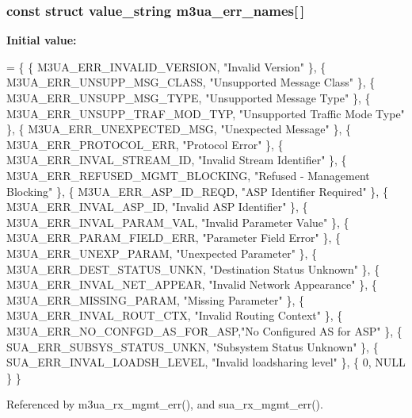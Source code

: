 \subsubsection[{m3ua\+\_\+err\+\_\+names}]{\setlength{\rightskip}{0pt plus 5cm}const struct value\+\_\+string m3ua\+\_\+err\+\_\+names[$\,$]}\label{m3ua_8c_a11c55fb5f6f56682c1754819b5a80eba}
{\bfseries Initial value\+:}
\begin{DoxyCode}
= \{
        \{ M3UA_ERR_INVALID_VERSION,     \textcolor{stringliteral}{"Invalid Version"} \},
        \{ M3UA_ERR_UNSUPP_MSG_CLASS,    \textcolor{stringliteral}{"Unsupported Message Class"} \},
        \{ M3UA_ERR_UNSUPP_MSG_TYPE,     \textcolor{stringliteral}{"Unsupported Message Type"} \},
        \{ M3UA_ERR_UNSUPP_TRAF_MOD_TYP, \textcolor{stringliteral}{"Unsupported Traffic Mode Type"} \},
        \{ M3UA_ERR_UNEXPECTED_MSG,      \textcolor{stringliteral}{"Unexpected Message"} \},
        \{ M3UA_ERR_PROTOCOL_ERR,        \textcolor{stringliteral}{"Protocol Error"} \},
        \{ M3UA_ERR_INVAL_STREAM_ID,     \textcolor{stringliteral}{"Invalid Stream Identifier"} \},
        \{ M3UA_ERR_REFUSED_MGMT_BLOCKING, \textcolor{stringliteral}{"Refused - Management Blocking"} \},
        \{ M3UA_ERR_ASP_ID_REQD,         \textcolor{stringliteral}{"ASP Identifier Required"} \},
        \{ M3UA_ERR_INVAL_ASP_ID,        \textcolor{stringliteral}{"Invalid ASP Identifier"} \},
        \{ M3UA_ERR_INVAL_PARAM_VAL,     \textcolor{stringliteral}{"Invalid Parameter Value"} \},
        \{ M3UA_ERR_PARAM_FIELD_ERR,     \textcolor{stringliteral}{"Parameter Field Error"} \},
        \{ M3UA_ERR_UNEXP_PARAM,         \textcolor{stringliteral}{"Unexpected Parameter"} \},
        \{ M3UA_ERR_DEST_STATUS_UNKN,    \textcolor{stringliteral}{"Destination Status Unknown"} \},
        \{ M3UA_ERR_INVAL_NET_APPEAR,    \textcolor{stringliteral}{"Invalid Network Appearance"} \},
        \{ M3UA_ERR_MISSING_PARAM,       \textcolor{stringliteral}{"Missing Parameter"} \},
        \{ M3UA_ERR_INVAL_ROUT_CTX,      \textcolor{stringliteral}{"Invalid Routing Context"} \},
        \{ M3UA_ERR_NO_CONFGD_AS_FOR_ASP,\textcolor{stringliteral}{"No Configured AS for ASP"} \},
        \{ SUA_ERR_SUBSYS_STATUS_UNKN,   \textcolor{stringliteral}{"Subsystem Status Unknown"} \},
        \{ SUA_ERR_INVAL_LOADSH_LEVEL,   \textcolor{stringliteral}{"Invalid loadsharing level"} \},
        \{ 0, NULL \}
\}
\end{DoxyCode}


Referenced by m3ua\+\_\+rx\+\_\+mgmt\+\_\+err(), and sua\+\_\+rx\+\_\+mgmt\+\_\+err().

